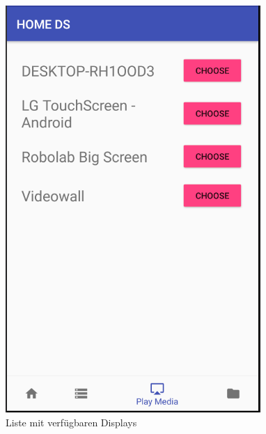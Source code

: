 \begin{figure}[H]
\centering
\includegraphics[scale=0.35]{images/06_AndroidApp/06_displayChoice}
\caption{Liste mit verfügbaren Displays}
\label{fig:mediaNav}
\end{figure}

